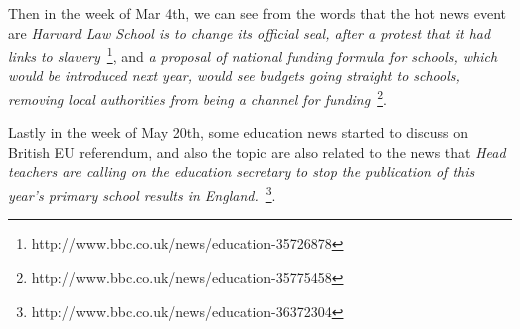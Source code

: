 Then in the week of Mar 4th, we can see from the words that the hot news event are \textit{Harvard Law School is to change its official seal, after a protest that it had links to slavery}~\footnote{http://www.bbc.co.uk/news/education-35726878}, and \textit{a proposal of national funding formula for schools, which would be introduced next year, would see budgets going straight to schools, removing local authorities from being a channel for funding}~\footnote{http://www.bbc.co.uk/news/education-35775458}. 

Lastly in the week of May 20th, some education news started to discuss on British EU referendum, and also the topic are also related to the news that \textit{Head teachers are calling on the education secretary to stop the publication of this year's primary school results in England.}~\footnote{http://www.bbc.co.uk/news/education-36372304}. 


